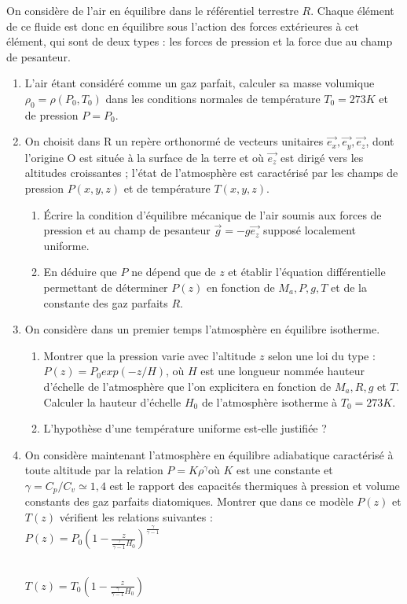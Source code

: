 \documentclass{article}
\begin{document}
On considère de l’air en équilibre dans le référentiel terrestre $R$. Chaque élément de ce fluide
est donc en équilibre sous l’action des forces extérieures à cet élément, qui sont de deux types :
les forces de pression et la force due au champ de pesanteur.
\begin{enumerate}
    \item  L’air étant considéré comme un gaz parfait, calculer sa masse volumique $\rho_0 = \rho(P_0, T_0)$
dans les conditions normales de température $T_0 = 273 K$ et de pression $P = P_0$.
\item On choisit dans R un repère orthonormé de vecteurs unitaires $\vec{e_x}, \vec{e_y}, \vec{e_z}$, dont l’origine
O est située à la surface de la terre et où $\vec{e_z}$ est dirigé vers les altitudes croissantes ; l’état de
l’atmosphère est caractérisé par les champs de pression $P(x, y, z)$ et de température $T(x, y, z)$.
\begin{enumerate}
    \item Écrire la condition d’équilibre mécanique de l’air soumis aux forces de pression et au champ de pesanteur $\vec{g}=-g\vec{e_z}$ supposé localement uniforme.
\item En déduire que $P$ ne dépend que de $z$ et établir l’équation différentielle permettant de
déterminer $ P(z)$ en fonction de $M_a, P, g, T$ et de la constante des gaz parfaits $R$.
\end{enumerate}
\item On considère dans un premier temps l’atmosphère en équilibre isotherme.
\begin{enumerate}
    \item Montrer que la pression varie avec l’altitude $z$ selon une loi du type : $P(z)=P_0 exp(-z/H)$, où $H$ est une longueur nommée hauteur d’échelle de l’atmosphère que l’on explicitera en fonction
de $M_a, R, g $ et $ T$. Calculer la hauteur d’échelle $H_0$ de l’atmosphère isotherme à $T_0 = 273 K$.
\item L’hypothèse d’une température uniforme est-elle justifiée ?
\end{enumerate}

\item  On considère maintenant l’atmosphère en équilibre adiabatique caractérisé à toute altitude
par la relation $P = K\rho ^\gamma $où $K$ est une constante et $\gamma = C_p /  C_v \simeq 1,4$
est le rapport des capacités
thermiques à pression et volume constants des gaz parfaits diatomiques. Montrer que dans ce modèle $P(z) $ et $T(z)$ vérifient les relations suivantes : \\

$P(z)=P_0(1-\frac{z}{\frac{\gamma}{\gamma -1}H_0})^{\frac{\gamma}{\gamma -1}}$

\\
$T(z)=T_0(1-\frac{z}{\frac{\gamma}{\gamma - 1} H_0})$


\end{enumerate}
\end{document}
